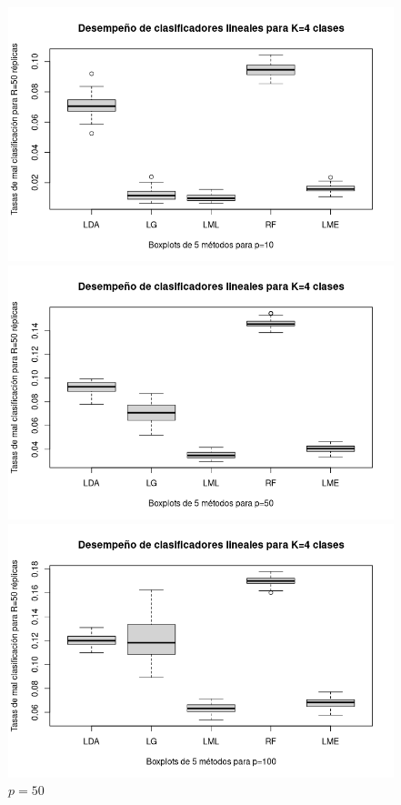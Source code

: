 \documentclass{report}
\begin{document}
  \begin{figure} [h]
  	\begin{multicols}{2}
  		\includegraphics[width=\linewidth]{4_clases_p10_sigma_II}\par 
  		\caption*{$p=10$}
  		\includegraphics[width=\linewidth]{4_clases_p50_sigma_II}\par 
  		\caption*{$p=50$}	 
  	\end{multicols}
  	\begin{multicols}{2}
  		\includegraphics[width=\linewidth]{4_clases_p100_sigma_II}\par

\end{multicols}
\end{figure}
\end{document}
